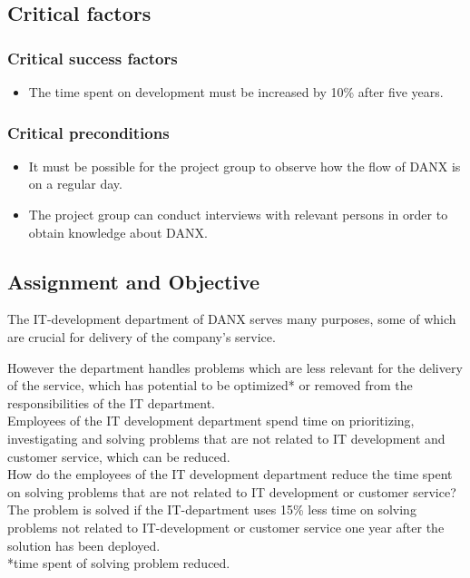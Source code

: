 \subsection{Critical factors}
\subsubsection{Critical success factors}
\begin{itemize}
	\item The time spent on development must be increased by 10\% after five years.
\end{itemize}

\subsubsection{Critical preconditions}
\begin{itemize}
	\item It must be possible for the project group to observe how the flow of DANX is on a regular day.
	\item The project group can conduct interviews with relevant persons in order to obtain knowledge about DANX.
\end{itemize}

\subsection{Assignment and Objective}
The IT-development department of DANX serves many purposes, some of which are crucial for delivery of the company's service.

However the department handles problems which are less relevant for the delivery of the service, which has potential to be optimized* or removed from the responsibilities of the IT department. \\

Employees of the IT development department spend time on prioritizing, investigating and solving problems that are not related to IT development and customer service, which can be reduced. \\

How do the employees of the IT development department reduce the time spent on solving problems that are not related to IT development or customer service? \\

The problem is solved if the IT-department uses 15\% less time on solving problems not related to IT-development or customer service one year after the solution has been deployed. \\
\small{*time spent of solving problem reduced.}\\

